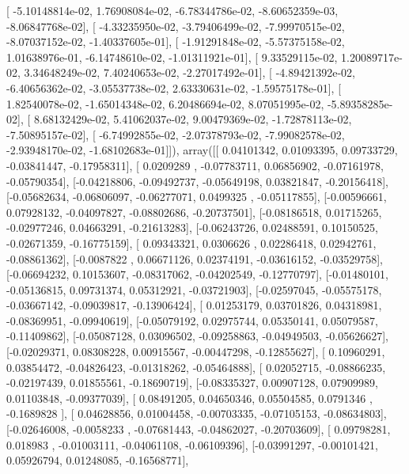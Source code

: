 \documentclass{article}
\begin{document}
       [ -5.10148814e-02,   1.76908084e-02,  -6.78344786e-02,
         -8.60652359e-03,  -8.06847768e-02],
       [ -4.33235950e-02,  -3.79406499e-02,  -7.99970515e-02,
         -8.07037152e-02,  -1.40337605e-01],
       [ -1.91291848e-02,  -5.57375158e-02,   1.01638976e-01,
         -6.14748610e-02,  -1.01311921e-01],
       [  9.33529115e-02,   1.20089717e-02,   3.34648249e-02,
          7.40240653e-02,  -2.27017492e-01],
       [ -4.89421392e-02,  -6.40656362e-02,  -3.05537738e-02,
          2.63330631e-02,  -1.59575178e-01],
       [  1.82540078e-02,  -1.65014348e-02,   6.20486694e-02,
          8.07051995e-02,  -5.89358285e-02],
       [  8.68132429e-02,   5.41062037e-02,   9.00479369e-02,
         -1.72878113e-02,  -7.50895157e-02],
       [ -6.74992855e-02,  -2.07378793e-02,  -7.99082578e-02,
         -2.93948170e-02,  -1.68102683e-01]]), array([[ 0.04101342,  0.01093395,  0.09733729, -0.03841447, -0.17958311],
       [ 0.0209289 , -0.07783711,  0.06856902, -0.07161978, -0.05790354],
       [-0.04218806, -0.09492737, -0.05649198,  0.03821847, -0.20156418],
       [-0.05682634, -0.06806097, -0.06277071,  0.0499325 , -0.05117855],
       [-0.00596661,  0.07928132, -0.04097827, -0.08802686, -0.20737501],
       [-0.08186518,  0.01715265, -0.02977246,  0.04663291, -0.21613283],
       [-0.06243726,  0.02488591,  0.10150525, -0.02671359, -0.16775159],
       [ 0.09343321,  0.0306626 ,  0.02286418,  0.02942761, -0.08861362],
       [-0.0087822 ,  0.06671126,  0.02374191, -0.03616152, -0.03529758],
       [-0.06694232,  0.10153607, -0.08317062, -0.04202549, -0.12770797],
       [-0.01480101, -0.05136815,  0.09731374,  0.05312921, -0.03721903],
       [-0.02597045, -0.05575178, -0.03667142, -0.09039817, -0.13906424],
       [ 0.01253179,  0.03701826,  0.04318981, -0.08369951, -0.09940619],
       [-0.05079192,  0.02975744,  0.05350141,  0.05079587, -0.11409862],
       [-0.05087128,  0.03096502, -0.09258863, -0.04949503, -0.05626627],
       [-0.02029371,  0.08308228,  0.00915567, -0.00447298, -0.12855627],
       [ 0.10960291,  0.03854472, -0.04826423, -0.01318262, -0.05464888],
       [ 0.02052715, -0.08866235, -0.02197439,  0.01855561, -0.18690719],
       [-0.08335327,  0.00907128,  0.07909989,  0.01103848, -0.09377039],
       [ 0.08491205,  0.04650346,  0.05504585,  0.0791346 , -0.1689828 ],
       [ 0.04628856,  0.01004458, -0.00703335, -0.07105153, -0.08634803],
       [-0.02646008, -0.0058233 , -0.07681443, -0.04862027, -0.20703609],
       [ 0.09798281,  0.018983  , -0.01003111, -0.04061108, -0.06109396],
       [-0.03991297, -0.00101421,  0.05926794,  0.01248085, -0.16568771],
\end{document}
